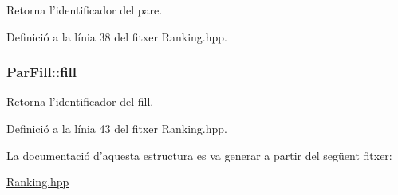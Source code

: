 Retorna l'identificador del pare. 



Definició a la línia 38 del fitxer Ranking.\-hpp.

\hypertarget{struct_par_fill_af35c09c217a6bc97860535cc395ebc94}{
\subsubsection[{fill}]{\setlength{\rightskip}{0pt plus 5cm}Par\-Fill\-::fill}}\label{struct_par_fill_af35c09c217a6bc97860535cc395ebc94}


Retorna l'identificador del fill. 



Definició a la línia 43 del fitxer Ranking.\-hpp.



La documentació d'aquesta estructura es va generar a partir del següent fitxer\-:\begin{DoxyCompactItemize}
\item 
\hyperlink{_ranking_8hpp}{Ranking.\-hpp}\end{DoxyCompactItemize}
